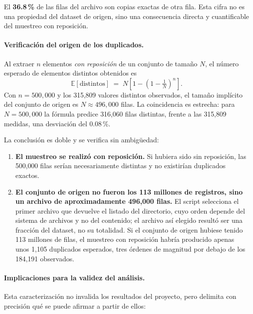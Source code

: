 El \textbf{36.8\,\%} de las filas del archivo son copias exactas de otra fila. Esta cifra no es una propiedad del dataset de origen, sino una consecuencia directa y cuantificable del muestreo con reposición.

\paragraph{Verificación del origen de los duplicados.} Al extraer $n$ elementos \textit{con reposición} de un conjunto de tamaño $N$, el número esperado de elementos distintos obtenidos es
\[
\mathbb{E}[\text{distintos}] \;=\; N\left[1-\left(1-\tfrac{1}{N}\right)^{n}\right].
\]
Con $n = 500{,}000$ y los 315,809 valores distintos observados, el tamaño implícito del conjunto de origen es $N \approx 496{,}000$ filas. La coincidencia es estrecha: para $N = 500{,}000$ la fórmula predice 316,060 filas distintas, frente a las 315,809 medidas, una desviación del 0.08\,\%.

La conclusión es doble y se verifica sin ambigüedad:

\begin{enumerate}[leftmargin=*]
    \item \textbf{El muestreo se realizó con reposición.} Si hubiera sido sin reposición, las 500,000 filas serían necesariamente distintas y no existirían duplicados exactos.
    \item \textbf{El conjunto de origen no fueron los 113 millones de registros, sino un archivo de aproximadamente 496,000 filas.} El script selecciona el primer archivo que devuelve el listado del directorio, cuyo orden depende del sistema de archivos y no del contenido; el archivo así elegido resultó ser una fracción del dataset, no su totalidad. Si el conjunto de origen hubiese tenido 113 millones de filas, el muestreo con reposición habría producido apenas unos 1,105 duplicados esperados, tres órdenes de magnitud por debajo de los 184,191 observados.
\end{enumerate}

\paragraph{Implicaciones para la validez del análisis.} Esta caracterización no invalida los resultados del proyecto, pero delimita con precisión qué se puede afirmar a partir de ellos:

